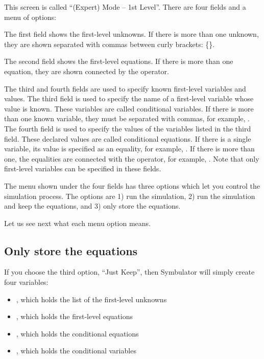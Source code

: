 This screen is called ``(Expert) Mode -- 1st Level''. There are four
fields and a menu of options:

The first field shows the first-level unknowns. If there is more
than one unknown, they are shown separated with commas between curly
brackets: \{\}.

The second field shows the first-level equations. If there is more
than one equation, they are shown connected by the 
operator.

The third and fourth fields are used to specify known first-level
variables and values. The third field is used to specify the name of
a first-level variable whose value is known. These variables are
called conditional variables. If there is more than one known
variable, they must be separated with commas, for example,
. The fourth field is used to specify the
values of the variables listed in the third field. These declared
values are called conditional equations. If there is a single
variable, its value is specified as an equality, for example,
. If there is more than one, the equalities are
connected with the  operator, for example, . Note that only first-level variables can be
specified in these fields.

The menu shown under the four fields has three options which let you
control the simulation process. The options are 1) run the
simulation, 2) run the simulation and keep the equations, and 3)
only store the equations.

Let us see next what each menu option means.

\subsection{Only store the equations}

If you choose the third option, ``Just Keep'', then Symbulator will
simply create four variables:

\begin{itemize}
\item {}, which holds the list of the first-level
  unknowns
\item {}, which holds the first-level equations
\item {}, which holds the conditional equations
\item {}, which holds the conditional variables
\end{itemize}

